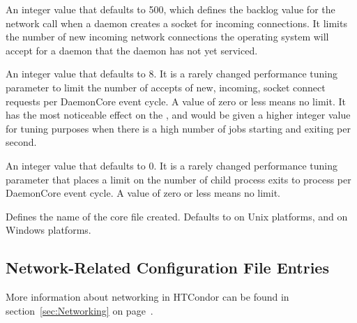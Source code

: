 \begin{description}
\label{param:SocketListenBacklog}
\item[\Macro{SOCKET\_LISTEN\_BACKLOG}]
  An integer value that defaults to 500,
  which defines the backlog value for the  
  network call when a daemon creates a socket for incoming connections.
  It limits the number of new incoming network connections the operating
  system will accept for a daemon that the daemon has not yet serviced.

\label{param:MaxAcceptsPerCycle}
\item[\Macro{MAX\_ACCEPTS\_PER\_CYCLE}]
  An integer value that defaults to 8.
  It is a rarely changed performance tuning parameter to
  limit the number of accepts of new, incoming,
  socket connect requests per DaemonCore event cycle.
  A value of zero or less means no limit.
  It has the most noticeable effect on the ,
  and would be given a higher integer value for tuning purposes when 
  there is a high number of jobs starting and exiting per second.

\label{param:MaxReapsPerCycle}
\item[\Macro{MAX\_REAPS\_PER\_CYCLE}]
  An integer value that defaults to 0.  It is a rarely changed performance
  tuning parameter that places a limit on the number of child process exits to
  process per DaemonCore event cycle.  A value of zero or less means no limit.

\label{param:CoreFileName}
\item[\Macro{CORE\_FILE\_NAME}]
  Defines the name of the core file created.
  Defaults to  on Unix platforms,
  and  on Windows platforms.   

\end{description}

\subsection{\label{sec:Network-Related-Config-File-Entries}Network-Related Configuration File Entries}

More information about networking in HTCondor can be found in
section~\ref{sec:Networking} on page~\pageref{sec:Networking}.

